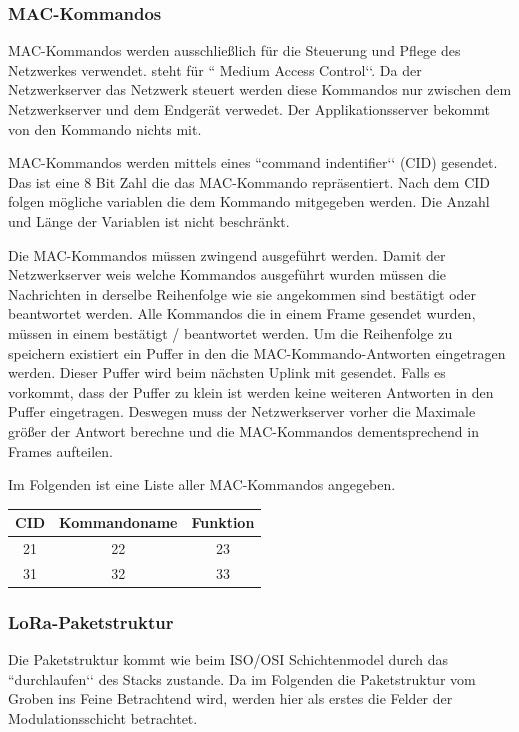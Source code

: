 \documentclass[a4paper,12pt]{article}
\begin{document}
            \subsubsection{MAC-Kommandos}
                MAC-Kommandos werden ausschließlich für die Steuerung und Pflege des Netzwerkes verwendet. steht 
                für `` Medium Access Control‘‘. Da der Netzwerkserver das Netzwerk steuert werden diese Kommandos nur 
                zwischen dem Netzwerkserver und dem Endgerät verwedet. Der Applikationsserver bekommt von den Kommando 
                nichts mit.

                MAC-Kommandos werden mittels eines ``command indentifier‘‘ (CID) gesendet. Das ist eine 8 Bit Zahl die 
                das MAC-Kommando repräsentiert. Nach dem CID folgen mögliche variablen die dem Kommando mitgegeben 
                werden. Die Anzahl und Länge der Variablen ist nicht beschränkt.
                
                Die MAC-Kommandos müssen zwingend ausgeführt werden. Damit der Netzwerkserver weis welche Kommandos 
                ausgeführt wurden müssen die Nachrichten in derselbe Reihenfolge wie sie angekommen sind bestätigt 
                oder beantwortet werden. Alle Kommandos die in einem Frame gesendet wurden, müssen in einem 
                bestätigt / beantwortet werden. Um die Reihenfolge zu speichern existiert ein Puffer in den die 
                MAC-Kommando-Antworten eingetragen werden. Dieser Puffer wird beim nächsten Uplink mit gesendet. 
                Falls es vorkommt, dass der Puffer zu klein ist werden keine weiteren Antworten in den Puffer 
                eingetragen. Deswegen muss der Netzwerkserver vorher die Maximale größer der Antwort berechne und die 
                MAC-Kommandos dementsprechend in Frames aufteilen.\cite[S.29 ff.]{LoRaSpec}

                Im Folgenden ist eine Liste aller MAC-Kommandos angegeben.
                \begin{table}
                    \centering
                    \begin{tabular}{c |c | c}
                        CID & Kommandoname & Funktion \\
                        \hline
                        21 & 22 & 23 \\
                        31 & 32 & 33
                    \end{tabular}
                \end{table}
            \subsubsection{LoRa-Paketstruktur}
                Die Paketstruktur kommt wie beim ISO/OSI Schichtenmodel durch das ``durchlaufen‘‘ des Stacks zustande. 
                Da im Folgenden die Paketstruktur vom Groben ins Feine Betrachtend wird, werden hier als erstes die Felder
                der Modulationsschicht betrachtet.
\end{document}
